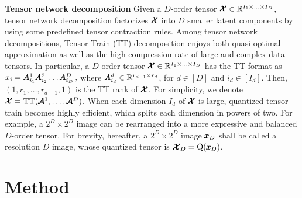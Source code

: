 \textbf{Tensor network decomposition} \quad
Given a $D$-order tensor $\pmb{\mathcal{X}} \in \mathbb{R}^{I_1 \times \ldots \times I_D}$,
tensor network decomposition factorizes $\pmb{\mathcal{X}}$ into $D$ smaller latent components
by using some predefined tensor contraction rules.
Among tensor network decompositions, Tensor Train (TT) decomposition \citep{oseledets2011tensor} enjoys both quasi-optimal approximation as well as the high compression rate of large and complex data tensors.
In particular, a $D$-order tensor $\pmb{\mathcal{X}} \in \mathbb{R}^{I_1\times \ldots \times I_D}$ has the TT format as
\(
{x}_{\mathbf{i}}= \pmb{A}^1_{i_1} \pmb{A}^2_{i_2} \ldots \pmb{A}^D_{i_D} \,,
\)
where $\pmb{A}^d_{i_d} \in \mathbb{R}^{r_{d-1}\times r_d}$, for $d\in[D]$ and $i_d \in [I_d]$. Then, $(1,r_1,\ldots,r_{d-1},1)$ is the TT rank of $\pmb{\mathcal{X}}$.
For simplicity, we denote $\pmb{\mathcal{X}}=\text{TT}(\pmb{\mathcal{A}}^1, \ldots, \pmb{\mathcal{A}}^D)$.
When each dimension $I_d$ of $\pmb{\mathcal{X}}$ is large,
quantized tensor train \citep[QTT,][]{khoromskij2011d} becomes highly efficient, which
splits each dimension in powers of two.
For example, a $2^D \times 2^D$ image can be rearranged into a more expressive and balanced
$D$-order tensor.
For brevity, hereafter, a $2^D \times 2^D$ image $\pmb{x}_D$ shall be called a resolution $D$ image, whose quantized tensor is $\pmb{\mathcal{X}}_D = \operatorname{Q}(\pmb{x}_D)$.


\section{Method}
\label{Method}

